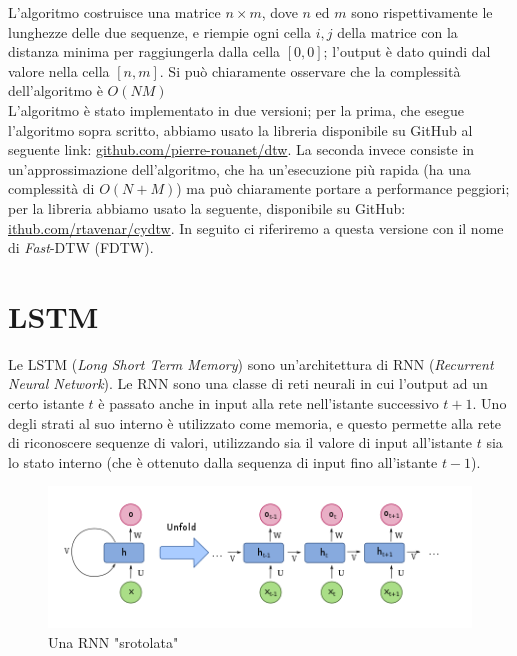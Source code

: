 \documentclass[8pt,notitlepage]{report}
\begin{document}
		L'algoritmo costruisce una matrice $ n \times m $, dove $ n $ ed $ m $ sono rispettivamente le lunghezze delle due sequenze, e riempie ogni cella $ i, j $ della matrice con la distanza minima per raggiungerla dalla cella $ [0, 0] $; l'output è dato quindi dal valore nella cella $ [n, m] $. Si può chiaramente osservare che la complessità dell'algoritmo è $ O(NM) $\\
		L'algoritmo è stato implementato in due versioni; per la prima, che esegue l'algoritmo sopra scritto, abbiamo usato la libreria disponibile su GitHub al seguente link: \href{https://github.com/pierre-rouanet/dtw}{github.com/pierre-rouanet/dtw}. La seconda invece consiste in un'approssimazione dell'algoritmo, che ha un'esecuzione più rapida (ha una complessità di $ O(N + M) $) ma può chiaramente portare a performance peggiori; per la libreria abbiamo usato la seguente, disponibile su GitHub: \href{https://github.com/rtavenar/cydtw}{ithub.com/rtavenar/cydtw}. In seguito ci riferiremo a questa versione con il nome di \textit{Fast}-DTW (FDTW).
		
		\newpage
		

	\section{LSTM}
		Le LSTM (\textit{Long Short Term Memory}) sono un'architettura di RNN (\textit{Recurrent Neural Network}). Le RNN sono una classe di reti neurali in cui l'output ad un certo istante $ t $ è passato anche in input alla rete nell'istante successivo $ t + 1 $. Uno degli strati al suo interno è utilizzato come memoria, e questo permette alla rete di riconoscere sequenze di valori, utilizzando sia il valore di input all'istante $ t $ sia lo stato interno (che è ottenuto dalla sequenza di input fino all'istante $ t - 1 $). 
		
		\begin{figure}[H]
			\begin{center}
				\includegraphics[scale=.55]{rnn}
				\caption{Una RNN "srotolata"}
			\end{center}
		\end{figure}
		
\end{document}
